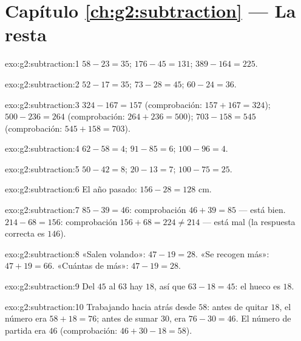 \section*{Capítulo \ref{ch:g2:subtraction} --- La resta}

\begin{solution}{exo:g2:subtraction:1}
$58 - 23 = 35$; \quad $176 - 45 = 131$; \quad $389 - 164 = 225$.
\end{solution}

\begin{solution}{exo:g2:subtraction:2}
$52 - 17 = 35$; \quad $73 - 28 = 45$; \quad $60 - 24 = 36$.
\end{solution}

\begin{solution}{exo:g2:subtraction:3}
$324 - 167 = 157$ (comprobación: $157 + 167 = 324$); \quad
$500 - 236 = 264$ (comprobación: $264 + 236 = 500$); \quad
$703 - 158 = 545$ (comprobación: $545 + 158 = 703$).
\end{solution}

\begin{solution}{exo:g2:subtraction:4}
$62 - 58 = 4$; \quad $91 - 85 = 6$; \quad $100 - 96 = 4$.
\end{solution}

\begin{solution}{exo:g2:subtraction:5}
$50 - 42 = 8$; \quad $20 - 13 = 7$; \quad $100 - 75 = 25$.
\end{solution}

\begin{solution}{exo:g2:subtraction:6}
El año pasado: $156 - 28 = 128$ cm.
\end{solution}

\begin{solution}{exo:g2:subtraction:7}
$85 - 39 = 46$: comprobación $46 + 39 = 85$ --- está bien.
$214 - 68 = 156$: comprobación $156 + 68 = 224 \neq 214$ --- está mal (la
respuesta correcta es $146$).
\end{solution}

\begin{solution}{exo:g2:subtraction:8}
«Salen volando»: $47 - 19 = 28$. «Se recogen más»: $47 + 19 = 66$.
«Cuántas de más»: $47 - 19 = 28$.
\end{solution}

\begin{solution}{exo:g2:subtraction:9}
Del $45$ al $63$ hay $18$, así que $63 - 18 = 45$: el hueco es $18$.
\end{solution}

\begin{solution}{exo:g2:subtraction:10}
Trabajando hacia atrás desde $58$: antes de quitar $18$, el número era
$58 + 18 = 76$; antes de sumar $30$, era $76 - 30 = 46$. El
número de partida era $46$ (comprobación: $46 + 30 - 18 = 58$).
\end{solution}

